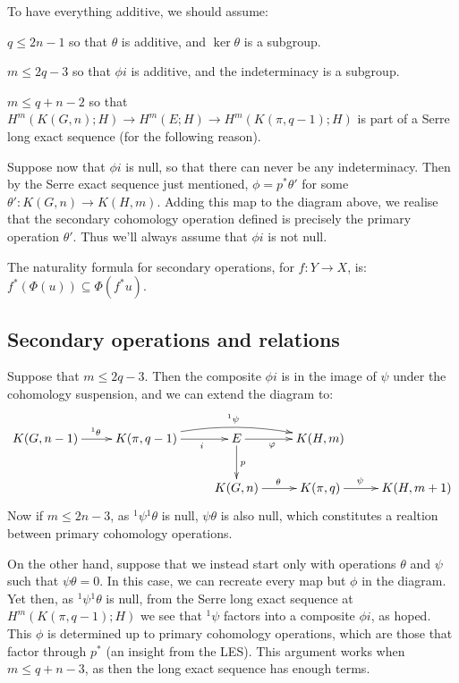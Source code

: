 \documentclass[11pt]{article}
\begin{document}
To have everything additive, we should assume:
\begin{itemise}
\item $q\leq 2n-1$ so that $\theta$ is additive, and $\ker\theta$ is a subgroup.
\item $m\leq 2q-3$ so that $\phi i$ is additive, and the indeterminacy is a
subgroup.
\item $m\leq q+n-2$ so that $H^m(K(G,n);H)\to H^m(E;H)\to H^m(K(\pi,q-1);H)$ is
part of a Serre long exact sequence (for the following reason).
\end{itemise}
Suppose now that $\phi i$ is null, so that there can never be any indeterminacy.
Then by the Serre exact sequence just mentioned, $\phi=p^*\theta'$ for some
$\theta':K(G,n)\to K(H,m)$. Adding this map to the diagram above, we realise
that the secondary cohomology operation defined is precisely the primary
operation $\theta'$. Thus we'll always assume that $\phi i$ is not null.

The naturality formula for secondary operations, for $f:Y\to X$, is:
$f^*(\Phi(u))\subseteq\Phi(f^*u)$.
\subsection{Secondary operations and relations}
Suppose that $m\leq 2q-3$. Then the composite $\phi i$ is in the image of $\psi$
under the cohomology suspension, and we can extend the diagram to:
\[\xymatrix{
K(G,n-1)\ar[r]^{^1\theta}&
K(\pi,q-1)\ar[r]_{\ \ \ \ \ i}\ar@/^.8pc/[rr]^{^1\psi}&
E\ar[r]_{\phi\ \ \ }\ar[d]^p&K(H,m)\\
&&%
K(G,n)\ar[r]^\theta&K(\pi,q)\ar[r]^{\psi\ \ \ \ }&
K(H,m+1)
}\]
Now if $m\leq 2n-3$, as ${^1\psi}{^1\theta}$ is null, $\psi\theta$ is also null,
which constitutes a realtion between primary cohomology operations.

On the other hand, suppose that we instead start only with operations $\theta$
and $\psi$ such that $\psi\theta=0$. In this case, we can recreate every map but
$\phi$ in the diagram. Yet then, as ${^1\psi}{^1\theta}$ is null, from the Serre
long exact sequence at $H^m(K(\pi,q-1);H)$ we see that ${^1\psi}$ factors into a
composite $\phi i$, as hoped. This $\phi$ is determined up to primary cohomology
operations, which are those that factor through $p^*$ (an insight from the LES).
This argument works when $m\leq q+n-3$, as then the long exact sequence has
enough terms.
\end{document}
